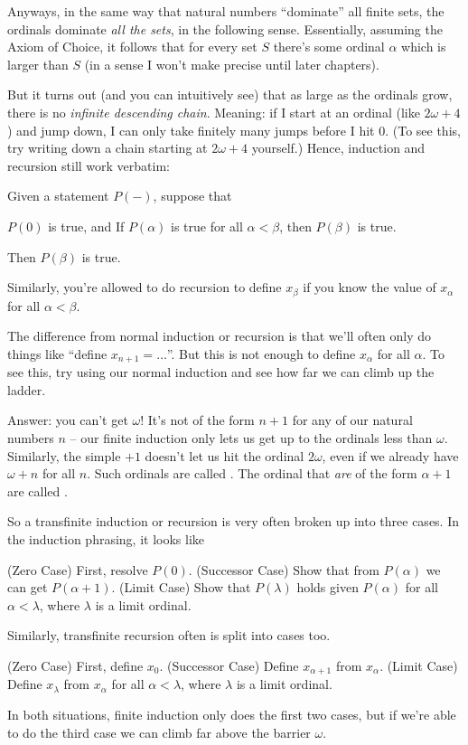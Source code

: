 Anyways, in the same way that natural numbers ``dominate'' all finite sets,
the ordinals dominate \emph{all the sets}, in the following sense.
Essentially, assuming the Axiom of Choice,
it follows that for every set $S$ there's some ordinal $\alpha$
which is larger than $S$ (in a sense I won't make precise until later chapters).

But it turns out (and you can intuitively see) that as large as the ordinals grow,
there is no \emph{infinite descending chain}.
Meaning: if I start at an ordinal (like $2 \omega + 4$) and jump down, I can only
take finitely many jumps before I hit $0$.
(To see this, try writing down a chain starting at $2 \omega + 4$ yourself.)
Hence, induction and recursion still work verbatim:
\begin{theorem}
	Given a statement $P(-)$, suppose that
	\begin{itemize}
		\ii $P(0)$ is true, and
		\ii If $P(\alpha)$ is true for all $\alpha < \beta$, then $P(\beta)$ is true.
	\end{itemize}
	Then $P(\beta)$ is true.
\end{theorem}
Similarly, you're allowed to do recursion to define $x_\beta$ if you know the
value of $x_\alpha$ for all $\alpha < \beta$.

The difference from normal induction or recursion is that we'll often
only do things like ``define $x_{n+1} = \dots$''.
But this is not enough to define $x_\alpha$ for all $\alpha$.
To see this, try using our normal induction and see how far we can climb up the ladder.

Answer: you can't get $\omega$!
It's not of the form $n+1$ for any of our natural numbers $n$ -- our finite induction only lets us
get up to the ordinals less than $\omega$.
Similarly, the simple $+1$ doesn't let us hit the ordinal $2\omega$,
even if we already have $\omega+n$ for all $n$.
Such ordinals are called .
The ordinal that \emph{are} of the form $\alpha+1$ are called .

So a transfinite induction or recursion is very often broken up into three cases.
In the induction phrasing, it looks like
\begin{itemize}
	\ii (Zero Case) First, resolve $P(0)$.
	\ii (Successor Case) Show that from $P(\alpha)$ we can get $P(\alpha+1)$.
	\ii (Limit Case) Show that $P(\lambda)$ holds given $P(\alpha)$ for all $\alpha < \lambda$,
	where $\lambda$ is a limit ordinal.
\end{itemize}
Similarly, transfinite recursion often is split into cases too.
\begin{itemize}
	\ii (Zero Case) First, define $x_0$.
	\ii (Successor Case) Define $x_{\alpha+1}$ from $x_\alpha$.
	\ii (Limit Case) Define $x_\lambda$ from $x_\alpha$ for all $\alpha < \lambda$,
	where $\lambda$ is a limit ordinal.
\end{itemize}
In both situations, finite induction only does the first two cases,
but if we're able to do the third case we can climb far above the barrier $\omega$.

